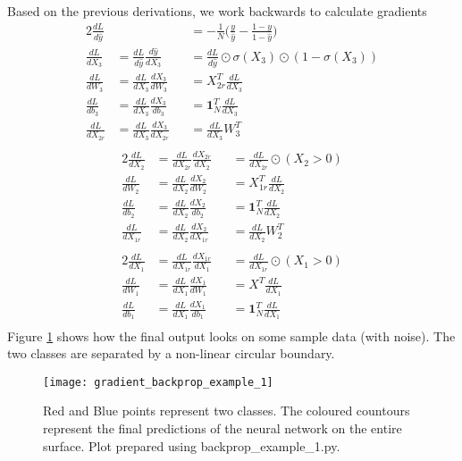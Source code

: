 \documentclass[../../deep_learning_notes.tex]{subfiles}
\begin{document}
Based on the previous derivations, we work backwards to calculate gradients
\begin{alignat*}{2}
    \frac{dL}{d\hat{y}} & & &= -\frac{1}{N} \bigg( \frac{y}{\hat{y}} - \frac{1-y}{1-\hat{y}} \bigg)\\
    \frac{dL}{dX_{3}} &= \frac{dL}{d\hat{y}} \frac{d\hat{y}}{dX_{3}}
    & &= \frac{dL}{d\hat{y}} \odot \sigma(X_{3}) \odot (1 - \sigma(X_{3}))\\
    \frac{dL}{dW_{3}} &= \frac{dL}{dX_{3}} \frac{dX_{3}}{dW_{3}} & &= X_{2r}^{T} \frac{dL}{dX_{3}}\\
    \frac{dL}{db_{3}} &= \frac{dL}{dX_{3}} \frac{dX_{3}}{db_{3}} & &= \bm{1}_{N}^{T}\frac{dL}{dX_{3}}\\
    \frac{dL}{dX_{2r}} &= \frac{dL}{dX_{3}} \frac{dX_{3}}{dX_{2r}} & &= \frac{dL}{dX_{3}}W_{3}^{T}\\
\end{alignat*}
\begin{alignat*}{2}
    \frac{dL}{dX_{2}} &= \frac{dL}{dX_{2r}} \frac{dX_{2r}}{dX_{2}} & &=\frac{dL}{dX_{2r}} \odot (X_{2} > 0)\\
    \frac{dL}{dW_{2}} &= \frac{dL}{dX_{2}} \frac{dX_{2}}{dW_{2}} & &= X_{1r}^{T} \frac{dL}{dX_{2}}\\
    \frac{dL}{db_{2}} &= \frac{dL}{dX_{2}} \frac{dX_{2}}{db_{2}} & &= \bm{1}_{N}^{T} \frac{dL}{dX_{2}}\\
    \frac{dL}{dX_{1r}} &= \frac{dL}{dX_{2}} \frac{dX_{2}}{dX_{1r}} & &=\frac{dL}{dX_{2}} W_{2}^{T}\\
\end{alignat*}
\begin{alignat*}{2}
    \frac{dL}{dX_{1}} &= \frac{dL}{dX_{1r}} \frac{dX_{1r}}{dX_{1}} & &= \frac{dL}{dX_{1r}} \odot (X_{1} > 0)\\
    \frac{dL}{dW_{1}} &= \frac{dL}{dX_{1}} \frac{dX_{1}}{dW_{1}} & &= X^{T}\frac{dL}{dX_{1}}\\
    \frac{dL}{db_{1}} &= \frac{dL}{dX_{1}} \frac{dX_{1}}{db_{1}} & &= \bm{1}_{N}^{T}\frac{dL}{dX_{1}}\\
\end{alignat*}
Figure \ref{fig:gradient_backprop_example_1} shows how the final output looks on some sample data (with noise). The two classes are separated by a non-linear circular boundary.

\begin{figure}[h]
    \texttt{[image: gradient\_backprop\_example\_1]}
    \centering
    \caption {Red and Blue points represent two classes. The coloured countours represent the final predictions of the neural network on the entire surface. Plot prepared using backprop\_example\_1.py.}
    \label{fig:gradient_backprop_example_1} %
\end{figure}
\end{document}
